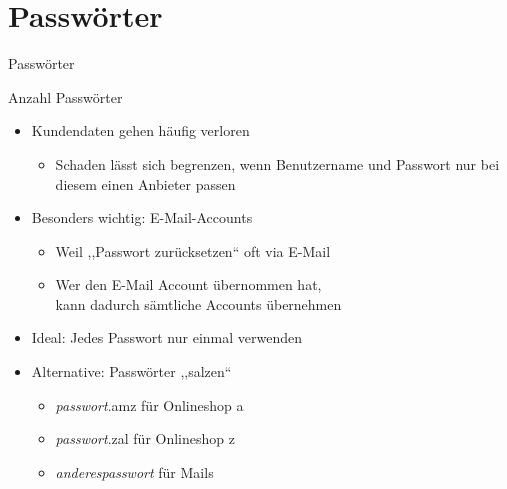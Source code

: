 \section{Passwörter}
\begin{frame}{Passwörter}
  \footnotesize


\end{frame}

\begin{frame}{Anzahl Passwörter}
  \begin{itemize}
    \item Kundendaten gehen häufig verloren
    \begin{itemize}
      \item Schaden lässt sich begrenzen, wenn Benutzername und Passwort nur bei diesem einen Anbieter passen
    \end{itemize}
    \item Besonders wichtig: E-Mail-Accounts
    \begin{itemize}
      \item Weil ,,Passwort zurücksetzen`` oft via E-Mail
      \item Wer den E-Mail Account übernommen hat,\\ kann dadurch sämtliche Accounts übernehmen
    \end{itemize}
    \item Ideal: Jedes Passwort nur einmal verwenden
    \item Alternative: Passwörter ,,salzen``
    \begin{itemize}
      \item \textit{passwort}.amz für Onlineshop a
      \item \textit{passwort}.zal für Onlineshop z
      \item \textit{anderespasswort} für Mails
    \end{itemize}
  \end{itemize}
\end{frame}

